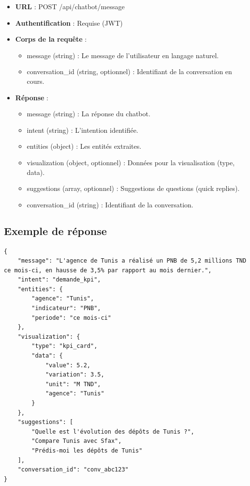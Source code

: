 \begin{itemize}
    \item \textbf{URL} : POST /api/chatbot/message
    \item \textbf{Authentification} : Requise (JWT)
    \item \textbf{Corps de la requête} :
        \begin{itemize}
            \item message (string) : Le message de l'utilisateur en langage naturel.
            \item conversation\_id (string, optionnel) : Identifiant de la conversation en cours.
        \end{itemize}
    \item \textbf{Réponse} :
        \begin{itemize}
            \item message (string) : La réponse du chatbot.
            \item intent (string) : L'intention identifiée.
            \item entities (object) : Les entités extraites.
            \item visualization (object, optionnel) : Données pour la visualisation (type, data).
            \item suggestions (array, optionnel) : Suggestions de questions (quick replies).
            \item conversation\_id (string) : Identifiant de la conversation.
        \end{itemize}
\end{itemize}

\subsection{Exemple de réponse}

\begin{verbatim}
{
    "message": "L'agence de Tunis a réalisé un PNB de 5,2 millions TND ce mois-ci, en hausse de 3,5% par rapport au mois dernier.",
    "intent": "demande_kpi",
    "entities": {
        "agence": "Tunis",
        "indicateur": "PNB",
        "periode": "ce mois-ci"
    },
    "visualization": {
        "type": "kpi_card",
        "data": {
            "value": 5.2,
            "variation": 3.5,
            "unit": "M TND",
            "agence": "Tunis"
        }
    },
    "suggestions": [
        "Quelle est l'évolution des dépôts de Tunis ?",
        "Compare Tunis avec Sfax",
        "Prédis-moi les dépôts de Tunis"
    ],
    "conversation_id": "conv_abc123"
}
\end{verbatim}

